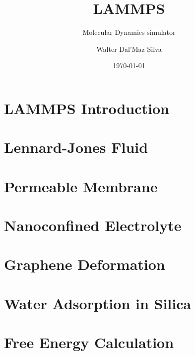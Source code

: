 \documentclass[aspectratio=169]{beamer}
\title{LAMMPS}
\subtitle{Molecular Dynamics simulator}
\author{Walter Dal'Maz Silva}
\date{\today}
\begin{document}
\maketitle

\section{LAMMPS Introduction}


\section{Lennard-Jones Fluid}


\section{Permeable Membrane}


\section{Nanoconfined Electrolyte}


\section{Graphene Deformation}


\section{Water Adsorption in Silica}


\section{Free Energy Calculation}

\end{document}
